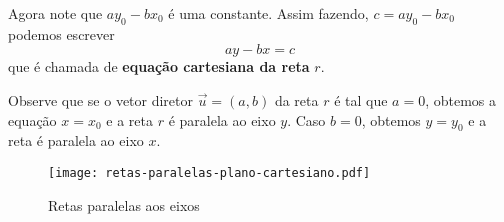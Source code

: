 Agora note que $ay_0 - bx_0$ \'e uma constante. Assim fazendo, $c = ay_0 - bx_0$ podemos escrever
\begin{equation}\label{equacao_cartesiana_reta_plano}
  ay - bx = c
\end{equation}
que \'e chamada de \textbf{equa\c{c}\~ao cartesiana da reta} $r$.

Observe que se o vetor diretor $\vec{u} = (a,b)$ da reta $r$  \'e tal que $a = 0$, obtemos a equa\c{c}\~ao $x = x_0$ e a reta $r$ \'e paralela ao eixo $y$. Caso $b = 0$, obtemos $y = y_0$ e a reta \'e paralela ao eixo $x$.
\begin{figure}[!h]
  \centering
  \caption{Retas paralelas aos eixos}
  \texttt{[image: retas-paralelas-plano-cartesiano.pdf]}




\end{figure}

